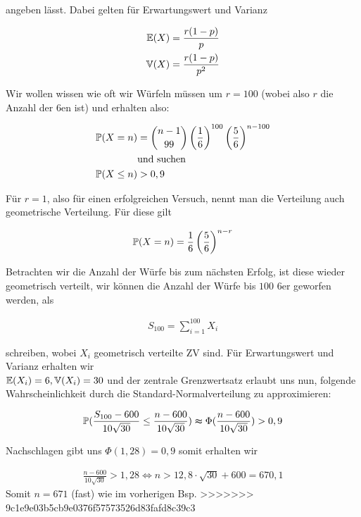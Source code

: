 \begin{solution}
angeben lässt. Dabei gelten für Erwartungswert und Varianz

\begin{align*}
  \E(X) &= \frac{r(1-p)}{p} \\
  \V(X) &= \frac{r(1-p)}{p^2}
\end{align*}

Wir wollen wissen wie oft wir Würfeln müssen um $r=100$ (wobei also $r$ die
Anzahl der $6$en ist) und erhalten also:

\begin{align*}
  \P(X=n) &= \binom{n-1}{99}\pbraces{\frac{1}{6}}^{100}\pbraces{\frac{5}{6}}^{n-100} \\
  &\text{und suchen} \\
  \P(X \leq n) &> 0,9
\end{align*}

Für $r=1$, also für einen erfolgreichen Versuch, nennt man die Verteilung auch
geometrische Verteilung. Für diese gilt

\begin{align*}
  \P(X=n)=\frac{1}{6}\pbraces{\frac{5}{6}}^{n-r}
\end{align*}

Betrachten wir die Anzahl der Würfe bis zum nächsten Erfolg, ist diese wieder
geometrisch verteilt, wir können die Anzahl der Würfe bis $100$ $6$er geworfen
werden, als

\begin{align*}
  S_{100} = \sum_{i=1}^{100}X_i
\end{align*}

schreiben, wobei $X_i$ geometrisch verteilte ZV sind. Für Erwartungswert und
Varianz erhalten wir \\
$\E(X_i)=6, \V(X_i)=30$ und der zentrale Grenzwertsatz erlaubt uns nun, folgende
Wahrscheinlichkeit durch die Standard-Normalverteilung zu approximieren:

\begin{align*}
  \P(\frac{S_{100}-600}{10\sqrt{30}} \leq \frac{n-600}{10\sqrt{30}}) \thickapprox
  \Phi(\frac{n-600}{10\sqrt{30}}) > 0,9
\end{align*}

Nachschlagen gibt uns $\Phi(1,28)=0,9$ somit erhalten wir

\begin{align*}
  \frac{n-600}{10\sqrt{30}} > 1,28 \Leftrightarrow
  n > 12,8 \cdot \sqrt{30} + 600 = 670,1
\end{align*}
Somit $n=671$ (fast) wie im vorherigen Bsp.
>>>>>>> 9c1e9e03b5cb9e0376f57573526d83fafd8c39c3
\end{solution}
